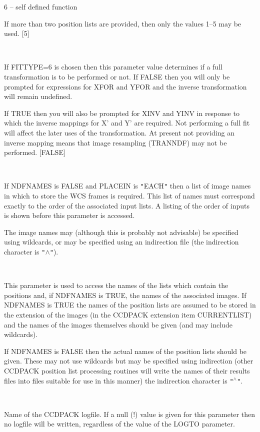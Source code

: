 \documentclass[twoside,11pt]{article}
\newcommand{\htmlref}[2]{#1}
\renewcommand{\_}{\texttt{\symbol{95}}}
\newcommand{\qt}[1]{{\tt "}#1{\tt "}}
\newcommand{\xroutine}[1]{\htmlref{{\sc #1}}{#1}}
\newcommand{\sstsubsection}[1]{ \item[{#1}] \mbox{} \\}
\newcommand{\sstitem}{\item}
\newcommand{\sstsubsection}[1]{\item[{#1}]}
\newcommand{\sstitem}{\item}
\begin{document}
{{{{            \sstitem
               6 -- self defined function

         }
         If more than two position lists are provided, then only the 
         values 1--5 may be used. 
         [5]
      }
      \sstsubsection{
         FULL = \_LOGICAL (Read)
      } {
         If FITTYPE=6 is chosen then this parameter value determines
         if a full transformation is to be performed or not. If FALSE
         then you will only be prompted for expressions for XFOR and
         YFOR and the inverse transformation will remain undefined.

         If TRUE then you will also be prompted for XINV and YINV in
         response to which the inverse mappings for X' and Y' are
         required. Not performing a full fit will affect the later
         uses of the transformation. At present not providing an inverse
         mapping means that image resampling (\xroutine{TRANNDF}) may not be
         performed.
         [FALSE]
      }
      \sstsubsection{
         IN = LITERAL (Read)
      } {
         If NDFNAMES is FALSE and PLACEIN is \qt{EACH} then a list of image
         names in which to store the WCS frames is required.  This
         list of names must correspond  exactly to the order of the
         associated input lists. A listing of the order of inputs is
         shown before this parameter is accessed.

         The image names may (although this is probably not advisable)
         be specified using wildcards, or may be specified using an
         indirection file (the indirection character is {\tt "}$\wedge${\tt "}).
      }
      \sstsubsection{
         INLIST = LITERAL (Read)
      } {
         This parameter is used to access the names of the lists
         which contain the positions and, if NDFNAMES is TRUE, the names
         of the associated images. If NDFNAMES is TRUE the names of the
         position lists are assumed to be stored in the extension of the
         images (in the CCDPACK extension item CURRENT\_LIST) and the names
         of the images themselves should be given (and may include
         wildcards).

         If NDFNAMES is FALSE then the actual names of the position
         lists should be given. These may not use wildcards but may be
         specified using indirection (other CCDPACK position list
         processing routines will write the names of their results
         files into files suitable for use in this manner) the
         indirection character is \qt{$^\wedge$}.
      }
      \sstsubsection{
         LOGFILE = FILENAME (Read)
      } {
         Name of the CCDPACK logfile.  If a null (!) value is given for
         this parameter then no logfile will be written, regardless of
         the value of the LOGTO parameter.

}}}
\end{document}
